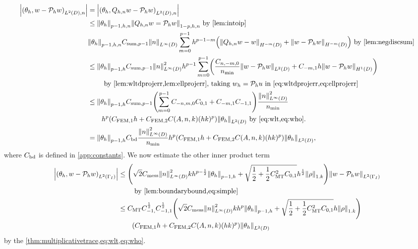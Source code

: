 \begin{align}
\abs{\IPLtDn{\thetah}{w- \Ph w}} &= \abs{\IPLtDn{\thetah}{\Qhn w - \Ph w}}\nonumber\\
&\leq \Nfn{p-1,h,n}{\thetah}\Nfn{1-p,h,n}{\Qhn w = \Ph w}\text{ by \cref{lem:intoip}}\nonumber\\
& \Nfn{p-1,h,n}{\thetah} \Csumfn{p-1} \NLiD{n} \sum_{m=0}^{p-1} h^{p-1-m}\mleft(\NHmmD{\Qhn w - w} + \NHmmD{w - \Ph w}\mright) \text{ by \cref{lem:negdiscsum}}\nonumber\\
&\leq \Nfn{p-1,h}{\thetah} \Csumfn{p-1} \NLiD{n}^2 h^{p-1} \sum_{m=0}^{p-1} \mleft(\frac{\Cfn{n,-m,0}}{\nmin} \NLtD{w - \Ph w} + \Cfn{-m,1} h \NHoD{w - \Ph w}\mright)\\
&\quad\quad\text{ by \cref{lem:wltdprojerr,lem:ellprojerr}, taking $\wh = \Ph u$ in \cref{eq:wltdprojerr,eq:ellprojerr}}\nonumber\\
&\leq \Nfn{p-1,h}{\thetah} \Csumfn{p-1}\mleft(\sum_{m=0}^{p-1} \Cfn{-n,m,0}\Cfn{0,1} + \Cfn{-m,1}\Cfn{-1,1}\mright) \frac{\NLiD{n}^2}{\nmin}\\
&\quad\quad h^p \mleft(\CFEMotilde h + \CFEMttilde \CAnk (hk)^p\mright) \NLtD{\thetah} \text{ by \cref{eq:wlt,eq:who}}.\nonumber\\
&=\Nfn{p-1,h}{\thetah}  \Cfourteen \frac{\NLiD{n}^2}{\nmin} h^p \mleft(\CFEMotilde h + \CFEMttilde \CAnk (hk)^p\mright) \NLtD{\thetah} \label{eq:innerprod1},
\end{align}
where $C_{\mathrm{bd}}$ is defined in \cref{app:constants}. We now estimate the other inner product term
\begin{align}
\abs{\IPLtGI{\thetah}{w - \Ph w}} &\leq \mleft(\sqrt{2} \Cmess\NLiD{n}^2 k h^{p-\half} \Nfn{p-1,h}{\thetah} + \sqrt{\half + \half \CMT^2 \Cfn{0,1}} h^{\half} \NW{\rho}\mright) \NLtGI{w - \Ph w}\\
&\quad\quad\text{ by \cref{lem:boundarybound,eq:simple}}\nonumber\\
&\leq \CMT \Cfn{-1,}^{\half}\Cfn{-1,1}^{\half} \mleft(\sqrt{2} \Cmess \NLiD{n}^2 kh^p \Nfn{p-1,h}{\thetah} + \sqrt{\half + \half \CMT^2 \Cfn{0,1}} h \NW{\rho}\mright)\nonumber\\
&\quad\quad\mleft(\CFEMotilde h + \CFEMttilde \CAnk (hk)^p\mright) \NLtD{\thetah}\label{eq:innerprod2}
\end{align}
 by the \cref{thm:multiplicativetrace,eq:wlt,eq:who}.

